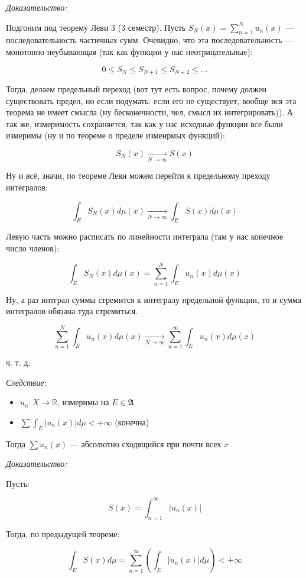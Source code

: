 \documentclass{article}
\def\goesto#1{\underset{#1}{\longrightarrow}}
\def\toinf#1{\goesto{#1 \rightarrow \infty}}
\begin{document}
\textit{Доказательство:}

Подгоним под теорему Леви 3 (3 семестр). Пусть $S_{N}(x) = \sum_{n = 1}^{N} u_n(x)$ --- последовательность частичных сумм. Очевидно, что эта последовательность --- монотонно неубывающая (так как функции у нас неотрицательные): 

\[0 \le S_{N} \le S_{N + 1} \le S_{N + 2} \le \ldots\]

Тогда, делаем предельный переход (вот тут есть вопрос, почему должен существовать предел, но если подумать: если его не существует, вообще вся эта теорема не имеет смысла (ну бесконечности, чел, смысл их интегрировать)). А так же, измеримость сохраняется, так как у нас исходные функции все были измеримы (ну и по теореме о пределе измеирмых функций): 

\[S_{N}(x) \toinf{N} S(x)\]

Ну и всё, значи, по теореме Леви можем перейти к предельному преходу интегралов: 

\[\int_{E} S_{N}(x) d\mu(x) \toinf{N} \int_{E} S(x) d\mu(x)\]

Левую часть можно расписать по линейности интеграла (там у нас конечное число членов): 

\[\int_{E} S_{N}(x) d\mu(x) = \sum_{n = 1}^{N} \int_{E} u_n(x) d\mu(x)\]

Ну, а раз интграл суммы стремится к интегралу предельной функции, то и сумма интегралов обязана туда стремиться.

\[\sum_{n = 1}^{N} \int_{E} u_n(x) d\mu(x) \toinf{N} \sum_{n = 1}^{\infty} \int_{E} u_n(x) d\mu(x)\]

ч. т. д. 


\textit{Следствие: }

\begin{itemize}
    \item $u_n: X \rightarrow \mathbb{R}$, измеримы на $E \in \mathfrak{A}$
    \item $\sum \int_{E} |u_n(x)| d\mu < +\infty$ (конечна)
\end{itemize}

Тогда $\sum u_n(x)$ --- абсолютно сходящийся при почти всех $x$

\textit{Доказательство: }

Пусть: 

\[S(x) = \int_{n = 1}^{\infty} \left|u_n(x)\right|\]

Тогда, по предыдущей теореме: 

\[\int_{E} S(x) d\mu = \sum_{n = 1}^{\infty} \left(\int_{E} |u_n(x)| d\mu\right) < +\infty\]
\end{document}
